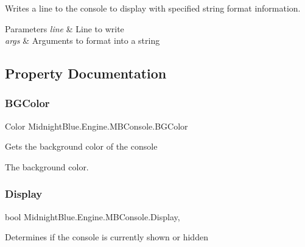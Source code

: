 Writes a line to the console to display with specified string format information. 


\begin{DoxyParams}{Parameters}
{\em line} & Line to write\\
\hline
{\em args} & Arguments to format into a string\\
\hline
\end{DoxyParams}


\subsection{Property Documentation}
\hypertarget{class_midnight_blue_1_1_engine_1_1_m_b_console_a159d6456b6408549cab4e96c83ccac74}{}\label{class_midnight_blue_1_1_engine_1_1_m_b_console_a159d6456b6408549cab4e96c83ccac74} 
\subsubsection{\texorpdfstring{B\+G\+Color}{BGColor}}
{\footnotesize\ttfamily Color Midnight\+Blue.\+Engine.\+M\+B\+Console.\+B\+G\+Color\hspace{0.3cm}{\ttfamily [get]}}



Gets the background color of the console 

The background color.\hypertarget{class_midnight_blue_1_1_engine_1_1_m_b_console_aa47a4c245dd21a4cd18a3348119e7757}{}\label{class_midnight_blue_1_1_engine_1_1_m_b_console_aa47a4c245dd21a4cd18a3348119e7757} 
\subsubsection{\texorpdfstring{Display}{Display}}
{\footnotesize\ttfamily bool Midnight\+Blue.\+Engine.\+M\+B\+Console.\+Display\hspace{0.3cm}{\ttfamily [get]}, {\ttfamily [set]}}



Determines if the console is currently shown or hidden 

